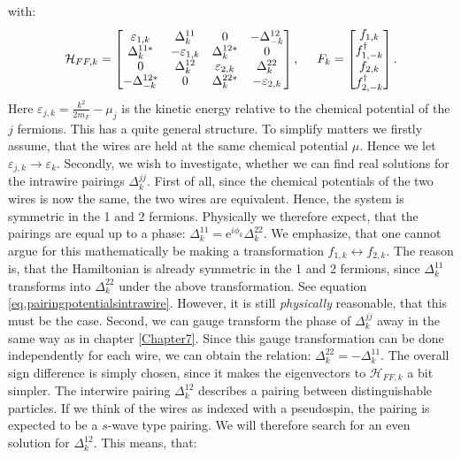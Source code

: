 with:
\begin{equation}
\mathcal{H}_{FF,k} = \begin{bmatrix} \varepsilon_{1,k} & \Delta^{11}_k      & 0                 & -\Delta^{12}_{-k} \\ 
                                     \Delta^{11 *}_k   & -\varepsilon_{1,k} & \Delta^{12*}_k    & 0 \\ 
                                    0                  & \Delta^{12}_k      & \varepsilon_{2,k} & \Delta^{22}_k \\ 
                                     -\Delta^{12*}_{-k}& 0                  & \Delta^{22*}_k    & -\varepsilon_{2,k} \end{bmatrix}, \hspace{0.5cm}
F_k =  \begin{bmatrix} f_{1,k} \\ f^\dagger_{1,-k} \\ f_{2,k} \\ f^\dagger_{2,-k} \end{bmatrix}.                                     
\end{equation}
Here $\varepsilon_{j,k} = \frac{k^2}{2m_F}-\mu_j$ is the kinetic energy relative to the chemical potential of the $j$ fermions. This has a quite general structure. To simplify matters we firstly assume, that the wires are held at the same chemical potential $\mu$. Hence we let $\varepsilon_{j,k} \to \varepsilon_k$. Secondly, we wish to investigate, whether we can find real solutions for the intrawire pairings $\Delta^{jj}_k$. First of all, since the chemical potentials of the two wires is now the same, the two wires are equivalent. Hence, the system is symmetric in the 1 and 2 fermions. Physically we therefore expect, that the pairings are equal up to a phase: $\Delta^{11}_k = \text{e}^{i\phi_k} \Delta^{22}_k$. We emphasize, that one cannot argue for this mathematically be making a transformation $f_{1,k} \leftrightarrow f_{2,k}$. The reason is, that the Hamiltonian is already symmetric in the 1 and 2 fermions, since $\Delta^{11}_k$ transforms into $\Delta^{22}_k$ under the above transformation. See equation \eqref{eq.pairingpotentialsintrawire}. However, it is still \textit{physically} reasonable, that this must be the case. Second, we can gauge transform the phase of $\Delta^{jj}_k$ away in the same way as in chapter \ref{Chapter7}. Since this gauge transformation can be done independently for each wire, we can obtain the relation: $\Delta^{22}_k = -\Delta^{11}_k$. The overall sign difference is simply chosen, since it makes the eigenvectors to $\mathcal{H}_{FF,k}$ a bit simpler. The interwire pairing $\Delta^{12}_k$ describes a pairing between distinguishable particles. If we think of the wires as indexed with a pseudospin, the pairing is expected to be a $s$-wave type pairing. We will therefore search for an even solution for $\Delta^{12}_k$. This means, that:
